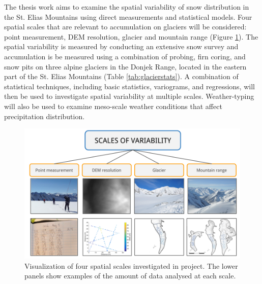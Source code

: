 \documentclass{sfuthesis}
\begin{document}
The thesis work aims to examine the spatial variability of snow distribution  in the St. Elias Mountains using direct measurements and statistical models. Four spatial scales that are relevant to accumulation on glaciers will be considered: point measurement, DEM resolution, glacier and mountain range (Figure \ref{fig:flowchart_scales}). The spatial variability is measured by conducting an extensive snow survey and accumulation is be measured using a combination of probing, firn coring, and snow pits on three alpine glaciers in the Donjek Range, located in the eastern part of the St. Elias Mountains (Table \ref{tab:glacierstats}). A combination of statistical techniques, including basic statistics, variograms, and regressions, will then be used to investigate spatial variability at multiple scales. Weather-typing will also be used to examine meso-scale weather conditions that affect precipitation distribution. 

  \begin{figure}
           \includegraphics[width = \textwidth]{ScalesOfVariability.png}
       \caption{Visualization of four spatial scales investigated in project. The lower panels show examples of the amount of data analysed at each scale.}
       \label{fig:flowchart_scales}
\end{figure}
\end{document}
